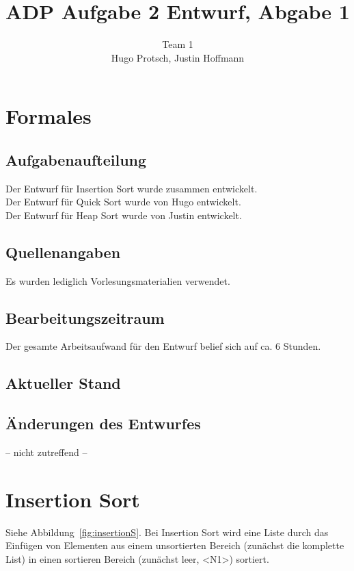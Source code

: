 \documentclass[11pt]{article}
\title{ADP Aufgabe 2 Entwurf, Abgabe 1}
\author{Team 1\\Hugo Protsch, Justin Hoffmann}
\begin{document}
    \maketitle

    \tableofcontents


    \section*{Formales}\label{sec:Formales}


    \subsection*{Aufgabenaufteilung}
    Der Entwurf für Insertion Sort wurde zusammen entwickelt.\\
    Der Entwurf für Quick Sort wurde von Hugo entwickelt.\\
    Der Entwurf für Heap Sort wurde von Justin entwickelt.

    \subsection*{Quellenangaben}
    Es wurden lediglich Vorlesungsmaterialien verwendet.

    \subsection*{Bearbeitungszeitraum}
    Der gesamte Arbeitsaufwand für den Entwurf belief sich auf ca. 6 Stunden.


    \subsection*{Aktueller Stand}

    \subsection*{Änderungen des Entwurfes}
    -- nicht zutreffend --

    \newpage


    \section{Insertion Sort}\label{sec:insertion-sort}
    Siehe Abbildung~\ref{fig:insertionS}.
    Bei Insertion Sort wird eine Liste durch das Einfügen von Elementen aus
    einem unsortierten Bereich (zunächst die komplette List) in einen sortieren
    Bereich (zunächst leer, <N1>) sortiert.
\end{document}
